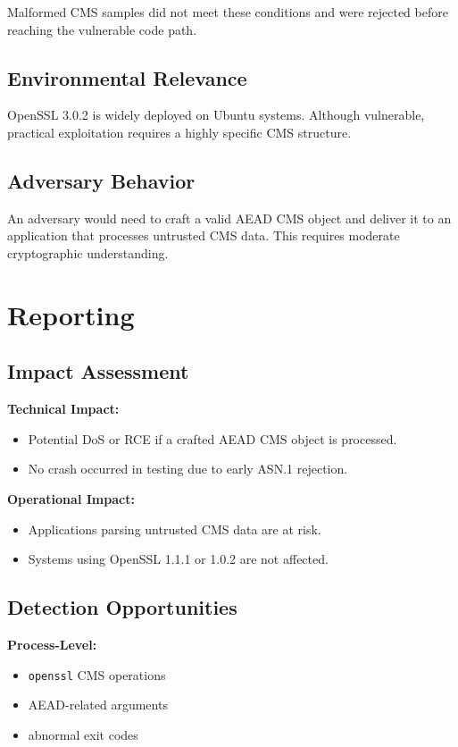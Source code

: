 \documentclass[12pt]{article}
\begin{document}
Malformed CMS samples did not meet these conditions and were rejected 
before reaching the vulnerable code path.

\subsection*{Environmental Relevance}
OpenSSL 3.0.2 is widely deployed on Ubuntu systems. Although vulnerable, 
practical exploitation requires a highly specific CMS structure.

\subsection*{Adversary Behavior}
An adversary would need to craft a valid AEAD CMS object and deliver it 
to an application that processes untrusted CMS data. This requires 
moderate cryptographic understanding.

\section{Reporting}

\subsection*{Impact Assessment}

\textbf{Technical Impact:}
\begin{itemize}
    \item Potential DoS or RCE if a crafted AEAD CMS object is processed.
    \item No crash occurred in testing due to early ASN.1 rejection.
\end{itemize}

\textbf{Operational Impact:}
\begin{itemize}
    \item Applications parsing untrusted CMS data are at risk.
    \item Systems using OpenSSL 1.1.1 or 1.0.2 are not affected.
\end{itemize}

\subsection*{Detection Opportunities}

\textbf{Process-Level:}
\begin{itemize}
    \item \texttt{openssl} CMS operations
    \item AEAD-related arguments
    \item abnormal exit codes
\end{itemize}
\end{document}

